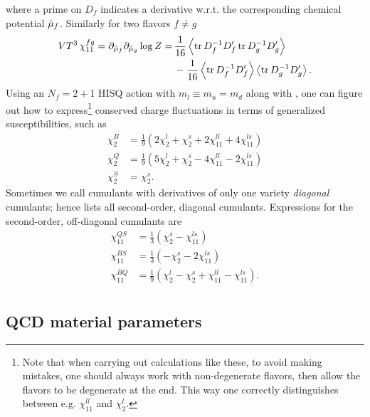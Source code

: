 where a prime on $D_f$ indicates a derivative w.r.t. the corresponding chemical
potential $\hat{\mu}_f$. Similarly for two flavors $f\neq g$ 
\begin{equation}\begin{aligned}
  VT^3\,\chi_{11}^{fg} =\partial_{\muh_f}\partial_{\muh_g}\log Z
                 = \,& \frac{1}{16}\ev{\tr D_f^{-1}D_f'\tr D_g^{-1}D_g'} \\
                   & -\frac{1}{16}\ev{\tr D_f^{-1}D_f'}\ev{\tr D_g^{-1}D_g'}.
\end{aligned}\end{equation}
Using an $N_f=2+1$ HISQ action with $m_l\equiv m_u=m_d$ along with 
, one can figure out how to 
express\footnote{Note that when carrying out calculations like these, to avoid making mistakes,
one should always work with non-degenerate flavors, then allow the flavors to be
degenerate at the end. This way one correctly distinguishes between e.g.
$\chi_{11}^{ll}$ and $\chi_2^l$.} conserved charge fluctuations in terms of 
generalized susceptibilities, such as
\begin{equation}\begin{aligned}\label{eq:2ndorderdiagonal}
  \chi_2^B&=\frac{1}{9}\left(2\chi_2^l+\chi_2^s+2\chi_{11}^{ll}+4\chi_{11}^{ls}\right)\\
  \chi_2^Q&=\frac{1}{9}\left(5\chi_2^l+\chi_2^s-4\chi_{11}^{ll}-2\chi_{11}^{ls}\right)\\
  \chi_2^S&=\chi_2^s.
\end{aligned}\end{equation}
Sometimes we call cumulants with derivatives of only one variety
{\it diagonal} cumulants; hence
 lists all second-order, diagonal cumulants.
Expressions for the second-order, off-diagonal cumulants are
\begin{equation}\begin{aligned}
\chi^{QS}_{11}&=\frac{1}{3}\left(\chi^{s}_{2}-\chi^{ls}_{11}\right)\\
\chi^{BS}_{11}&=\frac{1}{3}\left(-\chi^{s}_{2}-2\chi^{ls}_{11}\right)\\
\chi^{BQ}_{11}&=\frac{1}{9}\left(\chi^{l}_{2}-\chi^{s}_{2}+\chi^{ll}_{11}-\chi^{ls}_{11}\right).\\
\end{aligned}\end{equation}



\subsection{QCD material parameters}



